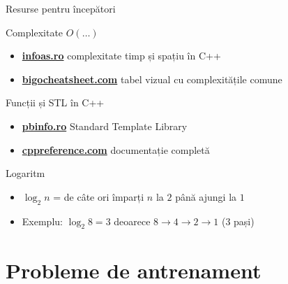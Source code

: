 ﻿\documentclass{beamer}
\begin{document}
\begin{frame}{Resurse pentru începători}
  \begin{block}{Complexitate \textemdash{} $O(\ldots)$}
    \begin{itemize}
      \item \href{https://infoas.ro/lectie/91/complexitatea-unui-algoritm-timp-si-spatiu-in-c}{\textbf{infoas.ro}} \textemdash{} complexitate timp și spațiu în C++
      \item \href{https://www.bigocheatsheet.com/}{\textbf{bigocheatsheet.com}} \textemdash{} tabel vizual cu complexitățile comune
    \end{itemize}
  \end{block}
  \begin{block}{Funcții și STL în C++}
    \begin{itemize}
      \item \href{https://www.pbinfo.ro/articole/23702/standard-template-library-stl}{\textbf{pbinfo.ro}} \textemdash{} Standard Template Library
      \item \href{https://cppreference.com}{\textbf{cppreference.com}} \textemdash{} documentație completă
    \end{itemize}
  \end{block}
  \begin{block}{Logaritm}
    \begin{itemize}
      \item $\log_2 n$ = de câte ori împarți $n$ la $2$ până ajungi la $1$
      \item Exemplu: $\log_2 8 = 3$ deoarece $8 \to 4 \to 2 \to 1$ (3 pași)
    \end{itemize}
  \end{block}
\end{frame}

\section{Probleme de antrenament}
\end{document}
